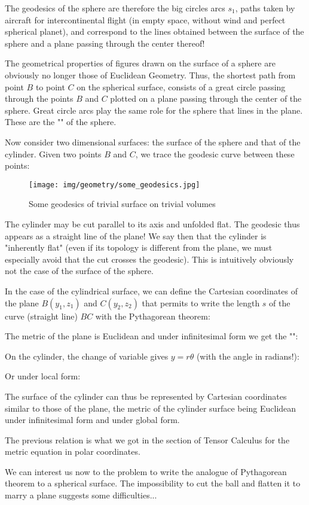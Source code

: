 	The geodesics of the sphere are therefore the big circles arcs $s_1$, paths taken by aircraft for intercontinental flight (in empty space, without wind and perfect spherical planet), and correspond to the lines obtained between the surface of the sphere and a plane passing through the center thereof!
	
	The geometrical properties of figures drawn on the surface of a sphere are obviously no longer those of Euclidean Geometry. Thus, the shortest path from point $B$ to point $C$ on the spherical surface, consists of a great circle passing through the points $B$ and $C$ plotted on a plane passing through the center of the sphere. Great circle arcs play the same role for the sphere that lines in the plane. These are the "" of the sphere.
	
	Now consider two dimensional surfaces: the surface of the sphere and that of the cylinder. Given two points $B$ and $C$, we trace the geodesic curve between these points:
	\begin{figure}[H]
		\centering
		\texttt{[image: img/geometry/some\_geodesics.jpg]}
		\caption{Some geodesics of trivial surface on trivial volumes}
	\end{figure}
	
	The cylinder may be cut parallel to its axis and unfolded flat. The geodesic thus appears as a straight line of the plane! We say then that the cylinder is "inherently flat" (even if its topology is different from the plane, we must especially avoid that the cut crosses the geodesic). This is intuitively obviously not the case of the surface of the sphere.
	
	In the case of the cylindrical surface, we can define the Cartesian coordinates of the plane $B(y_1,z_1)$ and $C(y_2,z_2)$ that permits to write the length $s$ of the curve (straight line) $BC$ with the Pythagorean theorem:
	
	The metric of the plane is Euclidean and under infinitesimal form we get the "":
	
	On the cylinder, the change of variable gives $y=r\theta$ (with the angle in radians!):
	
	Or under local form:
	
	The surface of the cylinder can thus be represented by Cartesian coordinates similar to those of the plane, the metric of the cylinder surface being Euclidean under infinitesimal form and under global form.
	\begin{tcolorbox}[title=Remark,colframe=black,arc=10pt]
	The previous relation is what we got in the section of Tensor Calculus for the metric equation in polar coordinates.
	\end{tcolorbox}
	We can interest us now to the problem to write the analogue of Pythagorean theorem to a spherical surface. The impossibility to cut the ball and flatten it to marry a plane suggests some difficulties...
	
